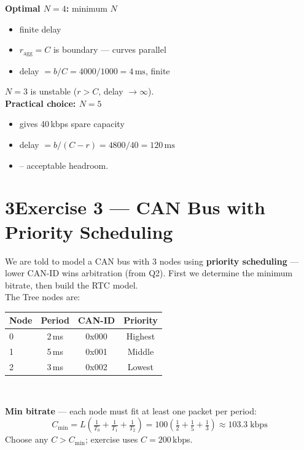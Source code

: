 \documentclass[10pt,a4paper]{article}
\begin{document}
\begin{minipage}[t]{0.36\textwidth}
\vspace{3pt}
\begin{keybox}
\textbf{Optimal $N=4$:} minimum $N$
\begin{itemize}
\item finite delay
\item $r_{\text{agg}} = C$ is boundary --- curves parallel 
\item delay $= b/C = 4000/1000 = 4\,\text{ms}$, finite
\end{itemize} 
$N=3$ is unstable ($r > C$, delay $\to \infty$).\\
\textbf{Practical choice: $N=5$} 
\begin{itemize}
\item gives 40\,kbps spare capacity
\item delay $= b/(C-r) = 4800/40 = 120\,\text{ms}$
\item -- acceptable headroom.
\end{itemize}
\end{keybox}
\end{minipage}

\section*{3\quad Exercise 3 --- CAN Bus with Priority Scheduling}
We are told to model a CAN bus with 3 nodes using \textbf{priority scheduling} --- lower CAN-ID wins arbitration (from Q2). First we determine the minimum bitrate, then build the RTC model. \\[4pt]
The Tree nodes are:
\begin{center}
\begin{tabular}{@{}l|c|c|c@{}}
Node & Period & CAN-ID & Priority \\\midrule
0 & 2\,ms & 0x000 & Highest \\
1 & 5\,ms & 0x001 & Middle \\
2 & 3\,ms & 0x002 & Lowest \\
\end{tabular} \\
\end{center}

\begin{keybox}
\textbf{Min bitrate} --- each node must fit at least one packet per period:
\[ C_{\min} = L\!\left(\tfrac{1}{T_0}+\tfrac{1}{T_1}+\tfrac{1}{T_2}\right) = 100\!\left(\tfrac{1}{2}+\tfrac{1}{5}+\tfrac{1}{3}\right) \approx 103.3\;\text{kbps} \]
Choose any $C > C_{\min}$; exercise uses $C = 200$\,kbps.
\end{keybox}
\end{document}
